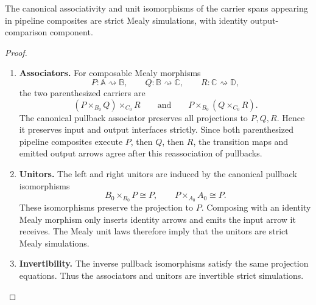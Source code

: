 \begin{lemma}
\label{lem:span-coherence-strict-mealy}
    The canonical associativity and unit isomorphisms of the carrier spans appearing in pipeline composites are strict Mealy simulations, with identity output-comparison component.
\end{lemma}
\begin{proof}
    \leavevmode
    \begin{enumerate}
        \item \textbf{Associators.} For composable Mealy morphisms
        \[
            P:\mathbb A\rightsquigarrow\mathbb B,
            \qquad
            Q:\mathbb B\rightsquigarrow\mathbb C,
            \qquad
            R:\mathbb C\rightsquigarrow\mathbb D,
        \]
        the two parenthesized carriers are
        \[
            (P\times_{B_0}Q)\times_{C_0}R
            \qquad\text{and}\qquad
            P\times_{B_0}(Q\times_{C_0}R).
        \]
        The canonical pullback associator preserves all projections to \(P,Q,R\). Hence it preserves input and output interfaces strictly. Since both parenthesized pipeline composites execute \(P\), then \(Q\), then \(R\), the transition maps and emitted output arrows agree after this reassociation of pullbacks.

        \item \textbf{Unitors.} The left and right unitors are induced by the canonical pullback isomorphisms
        \[
            B_0\times_{B_0}P\cong P,
            \qquad
            P\times_{A_0}A_0\cong P.
        \]
        These isomorphisms preserve the projection to \(P\). Composing with an identity Mealy morphism only inserts identity arrows and emits the input arrow it receives. The Mealy unit laws therefore imply that the unitors are strict Mealy simulations.

        \item \textbf{Invertibility.} The inverse pullback isomorphisms satisfy the same projection equations. Thus the associators and unitors are invertible strict simulations.
    \end{enumerate}
\end{proof}

